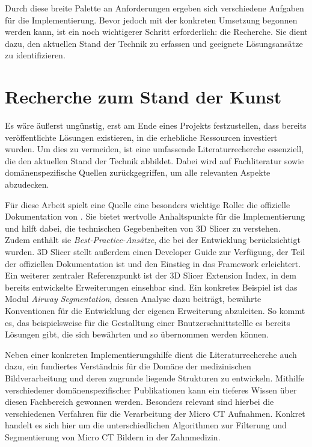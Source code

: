 Durch diese breite Palette an Anforderungen ergeben sich verschiedene Aufgaben
für die Implementierung. Bevor jedoch mit der konkreten Umsetzung begonnen werden
kann, ist ein noch wichtigerer Schritt erforderlich: die Recherche. Sie dient
dazu, den aktuellen Stand der Technik zu erfassen und geeignete Lösungsansätze zu
identifizieren.

\section{Recherche zum Stand der Kunst}
Es wäre äußerst ungünstig, erst am Ende eines Projekts festzustellen, dass bereits
veröffentlichte Lösungen existieren, in die erhebliche Ressourcen investiert
wurden. Um dies zu vermeiden, ist eine umfassende Literaturrecherche essenziell,
die den aktuellen Stand der Technik abbildet. Dabei wird auf Fachliteratur sowie
domänenspezifische Quellen zurückgegriffen, um alle relevanten Aspekte abzudecken.

Für diese Arbeit spielt eine Quelle eine besonders wichtige Rolle: die
offizielle Dokumentation von \citet{slicer2024}. Sie bietet wertvolle
Anhaltspunkte für die Implementierung und hilft dabei, die technischen Gegebenheiten
von 3D Slicer zu verstehen. Zudem enthält sie \textit{Best-Practice-Ansätze},
die bei der Entwicklung berücksichtigt wurden. 3D Slicer stellt außerdem einen Developer
Guide zur Verfügung, der Teil der offiziellen Dokumentation ist und den Einstieg
in das Framework erleichtert. Ein weiterer zentraler Referenzpunkt ist der 3D Slicer
Extension Index, in dem bereits entwickelte Erweiterungen einsehbar sind. Ein konkretes
Beispiel ist das Modul \textit{Airway Segmentation}, dessen Analyse dazu beiträgt,
bewährte Konventionen für die Entwicklung der eigenen Erweiterung abzuleiten. So
kommt es, das beispielsweise für die Gestalltung einer Bnutzerschnittstellle es
bereits Lösungen gibt, die sich bewährten und so übernommen werden können.

Neben einer konkreten Implementierungshilfe dient die Literaturrecherche auch dazu,
ein fundiertes Verständnis für die Domäne der medizinischen Bildverarbeitung und
deren zugrunde liegende Strukturen zu entwickeln. Mithilfe verschiedener domänenspezifischer
Publikationen kann ein tieferes Wissen über diesen Fachbereich gewonnen werden.
Besonders relevant sind hierbei die verschiedenen Verfahren für die Verarbeitung
der Micro CT Aufnahmen. Konkret handelt es sich hier um die unterschiedlichen Algorithmen
zur Filterung und Segmentierung von Micro CT Bildern in der Zahnmedizin.

